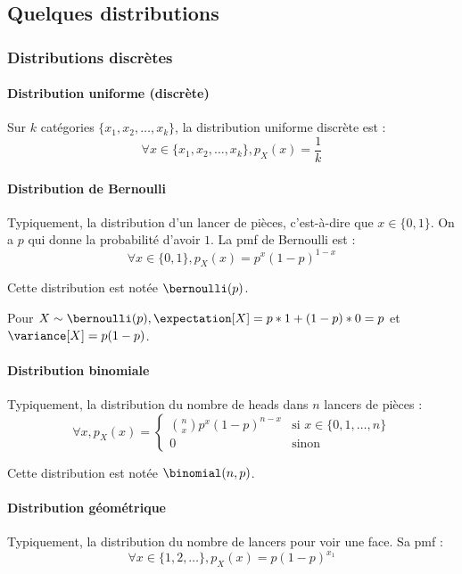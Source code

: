 \subsection{Quelques distributions}
    \subsubsection{Distributions discrètes}
        \paragraph{Distribution uniforme (discrète)}
            Sur \(k\) catégories \(\{x_1, x_2, \dots, x_k\}\), la distribution uniforme discrète est :
            \[
                \forall x \in \{x_1, x_2, \dots, x_k\}, p_X(x) = \frac{1}{k}
            \]

        \paragraph{Distribution de Bernoulli}
            Typiquement, la distribution d'un lancer de pièces, c'est-à-dire que \(x \in \{0, 1\}\). On a \(p\) qui donne la probabilité d'avoir \(1\). La pmf de Bernoulli est :
            \[
                \forall x \in \{0, 1\}, p_X(x) = p^x (1-p)^{1-x}
            \]

            Cette distribution est notée \(\bernoulli(p)\).

            Pour \(X \sim \bernoulli(p), \expectation[X] = p * 1 + (1 - p) * 0 = p\) et \(\variance[X] = p (1 - p)\).

        \paragraph{Distribution binomiale}
            Typiquement, la distribution du nombre de heads dans \(n\) lancers de pièces :
            \[
                \forall x, p_X(x) = \begin{cases}
                    \binom{n}{x} p^x (1 - p)^{n-x} & \text{si } x \in \{0, 1, \dots, n\}\\
                    0 & \text{sinon}
                \end{cases}
            \]

            Cette distribution est notée \(\binomial(n, p)\).

        \paragraph{Distribution géométrique}
            Typiquement, la distribution du nombre de lancers pour voir une face. Sa pmf :
            \[
                \forall x \in \{1, 2, \dots\}, p_X(x) = p(1-p)^{x_1}
            \]

